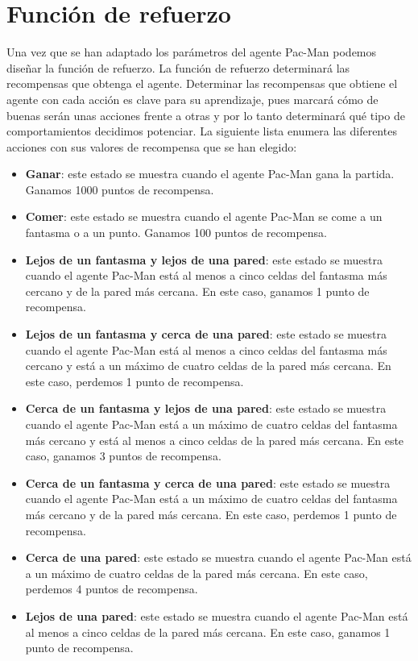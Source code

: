 \documentclass[11pt]{exam}
\begin{document}
\section{Función de refuerzo}\label{refuerzo}

Una vez que se han adaptado los parámetros del agente Pac-Man podemos diseñar la función de refuerzo. La función de refuerzo determinará las recompensas que obtenga el agente. Determinar las recompensas que obtiene el agente con cada acción es clave para su aprendizaje, pues marcará cómo de buenas serán unas acciones frente a otras y por lo tanto determinará qué tipo de comportamientos decidimos potenciar. La siguiente lista enumera las diferentes acciones con sus valores de recompensa que se han elegido:

\begin{itemize}
	\item \textbf{Ganar}: este estado se muestra cuando el agente Pac-Man gana la partida. Ganamos 1000 puntos de recompensa.
	
	\item \textbf{Comer}: este estado se muestra cuando el agente Pac-Man se come a un fantasma o a un punto. Ganamos 100 puntos de recompensa.
	
	\item \textbf{Lejos de un fantasma y lejos de una pared}: este estado se muestra cuando el agente Pac-Man está al menos a cinco celdas del fantasma más cercano y de la pared más cercana. En este caso, ganamos 1 punto de recompensa.
	
	\item \textbf{Lejos de un fantasma y cerca de una pared}: este estado se muestra cuando el agente Pac-Man está al menos a cinco celdas del fantasma más cercano y está a un máximo de cuatro celdas de la pared más cercana. En este caso, perdemos 1 punto de recompensa.
	
	\item \textbf{Cerca de un fantasma y lejos de una pared}: este estado se muestra cuando el agente Pac-Man está a un máximo de cuatro celdas del fantasma más cercano y está al menos a cinco celdas de la pared más cercana.  En este caso, ganamos 3 puntos de recompensa.
	
	\item \textbf{Cerca de un fantasma y cerca de una pared}: este estado se muestra cuando el agente Pac-Man está a un máximo de cuatro celdas del fantasma más cercano y de la pared más cercana. En este caso, perdemos 1 punto de recompensa.
	
	\item \textbf{Cerca de una pared}: este estado se muestra cuando el agente Pac-Man está a un máximo de cuatro celdas de la pared más cercana. En este caso, perdemos 4 puntos de recompensa.
	
	\item \textbf{Lejos de una pared}: este estado se muestra cuando el agente Pac-Man está al menos a cinco celdas de la pared más cercana. En este caso, ganamos 1 punto de recompensa.
\end{itemize}
\end{document}
